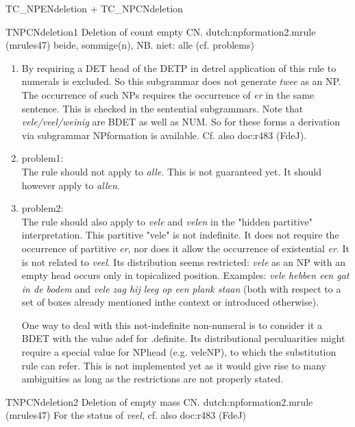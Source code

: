 \begin{mruleclass}{TC\_NPENdeletion + TC\_NPCNdeletion}
\begin{members}
\begin{member}
 TNPCNdeletion1
 Deletion of count empty CN.
\file dutch:npformation2.mrule (mrules47)
\semantics \nosemantics
\example beide, sommige(n), NB. niet: alle (cf. problems)
\remarks
\begin{enumerate}
\item By requiring a DET head of the DETP in detrel application of this rule
to numerals is excluded. So this subgrammar does not generate {\em twee} as an NP.
The occurrence of such NPs requires the occurrence of {\em er}
in the same sentence. This is checked 
in the sentential 
subgrammars. 
Note that {\em vele/veel/weinig} are BDET as well as NUM.
So for these forms 
a derivation via subgrammar NPformation
is available. Cf. also doc:r483 (FdeJ).
\item problem1:\\ The rule should not apply to {\em alle}. This is not 
guaranteed yet. 
It should however apply to {\em allen}.
\item problem2:\\ The rule should also apply to {\em vele} and 
{\em velen} in the "hidden
partitive" interpretation. This partitive "vele" is not indefinite. It does not
require the occurrence of partitive {\em er}, nor does it allow the occurrence
of existential {\em er}. It is not related to {\em veel}. Its distribution
seems restricted: {\em vele} as an NP with an empty head occurs only in
topicalized position. Examples: {\em vele hebben een gat in de bodem} and {\em
vele zag hij leeg op een plank staan} (both with respect to a set of boxes
already mentioned inthe context or introduced otherwise). 

One way to deal with
this not-indefinite non-numeral is to consider it a BDET with the value adef
for .definite. Its distributional peculuarities might require a special 
value for NPhead (e.g. veleNP), to which the substitution rule can refer. 
This is not 
implemented yet as it would give rise to many ambiguities as long as 
the restrictions are not properly stated. 
\end{enumerate}

\end{member}
\begin{member}
 TNPCNdeletion2
 Deletion of empty mass CN.
\file dutch:npformation2.mrule (mrules47)
\semantics \nosemantics
{}
\remarks For the status of {\em veel}, cf. also doc:r483 (FdeJ)
\end{member}

\end{members}
\end{mruleclass}


